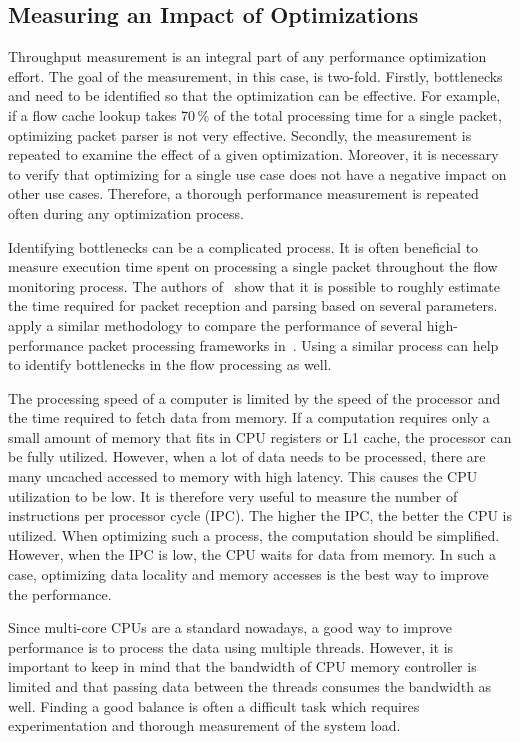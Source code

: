 \subsection{Measuring an Impact of Optimizations}

Throughput measurement is an integral part of any performance optimization effort. The goal of the measurement, in this case, is two-fold. Firstly, bottlenecks and need to be identified so that the optimization can be effective. For example, if a flow cache lookup takes 70\,\% of the total processing time for a single packet, optimizing packet parser is not very effective. Secondly, the measurement is repeated to examine the effect of a given optimization. Moreover, it is necessary to verify that optimizing for a single use case does not have a negative impact on other use cases. Therefore, a thorough performance measurement is repeated often during any optimization process.

Identifying bottlenecks can be a complicated process. It is often beneficial to measure execution time spent on processing a single packet throughout the flow monitoring process. The authors of~\cite{NETCOPETechnologies-2017-Modelling} show that it is possible to roughly estimate the time required for packet reception and parsing based on several parameters. \citeauthor{Gallenmueller-2015-Comparison} apply a similar methodology to compare the performance of several high-performance packet processing frameworks in~\cite{Gallenmueller-2015-Comparison}. Using a similar process can help to identify bottlenecks in the flow processing as well.

The processing speed of a computer is limited by the speed of the processor and the time required to fetch data from memory. If a computation requires only a small amount of memory that fits in CPU registers or L1 cache, the processor can be fully utilized. However, when a lot of data needs to be processed, there are many uncached accessed to memory with high latency. This causes the CPU utilization to be low. It is therefore very useful to measure the number of instructions per processor cycle (IPC). The higher the IPC, the better the CPU is utilized. When optimizing such a process, the computation should be simplified. However, when the IPC is low, the CPU waits for data from memory. In such a case, optimizing data locality and memory accesses is the best way to improve the performance. 

Since multi-core CPUs are a standard nowadays, a good way to improve performance is to process the data using multiple threads. However, it is important to keep in mind that the bandwidth of CPU memory controller is limited and that passing data between the threads consumes the bandwidth as well. Finding a good balance is often a difficult task which requires experimentation and thorough measurement of the system load.

